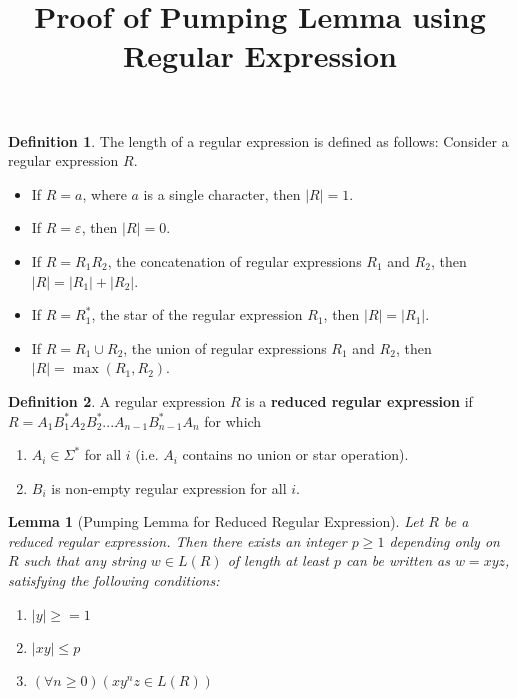\documentclass[11pt]{article}
\newtheorem*{lemma}{Lemma}
\theoremstyle{definition}
\newtheorem*{definition}{Definition}
\begin{document}
\author{}
\title{Proof of Pumping Lemma using Regular Expression}
\maketitle

\medskip
\begin{definition}The length of a regular expression is defined as follows: Consider a regular expression $R$.
\begin{itemize}
    \item If $R = a$, where $a$ is a single character, then $|R| = 1$.
    \item If $R = \varepsilon$, then $|R| = 0$. 
    \item If $R = R_1R_2$, the concatenation of regular expressions $R_1$ and $R_2$, then $|R| = |R_1| + |R_2|$.
    \item If $R = R_1^*$, the star of the regular expression $R_1$, then $|R| = |R_1|$. 
    \item If $R = R_1 \cup R_2$, the union of regular expressions $R_1$ and $R_2$, then $|R| = \max(R_1, R_2)$.
\end{itemize}
\end{definition}
\begin{definition}
A regular expression $R$ is a \textbf{reduced regular expression} if $R = A_1B_1^*A_2B_2^*...A_{n-1}B_{n-1}^*A_n$ for which
\begin{enumerate}
    \item $A_i \in \Sigma^*$ for all $i$ (i.e. $A_i$ contains no union or star operation).
    \item $B_i$ is non-empty regular expression for all $i$.
\end{enumerate}
\end{definition}
\begin{lemma}[Pumping Lemma for Reduced Regular Expression] Let $R$ be a reduced regular expression. Then there exists an integer $p\geq 1$ depending only on $R$ such that any string $w \in L(R)$ of length at least $p$ can be written as $w = xyz$, satisfying the following conditions:
\begin{enumerate}
    \item $|y| \geq = 1$
    \item $|xy|\leq p$
    \item $(\forall n\geq 0)(xy^nz\in L(R))$
\end{enumerate}
\end{lemma}
\end{document}
